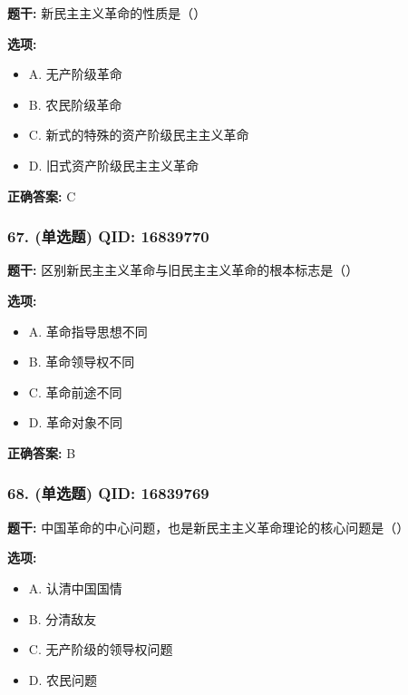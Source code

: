 \documentclass[12pt,UTF8]{ctexart}
\begin{document}
\textbf{题干:}
新民主主义革命的性质是（）

\textbf{选项:}
\begin{itemize}[leftmargin=*]

  \item A. 无产阶级革命

  \item B. 农民阶级革命

  \item C. 新式的特殊的资产阶级民主主义革命

  \item D. 旧式资产阶级民主主义革命

\end{itemize}

\textbf{正确答案:}
C

\vspace{0.3em}\hrulefill\vspace{0.7em}

\subsubsection*{67. (单选题) \small QID: 16839770}

\textbf{题干:}
区别新民主主义革命与旧民主主义革命的根本标志是（）

\textbf{选项:}
\begin{itemize}[leftmargin=*]

  \item A. 革命指导思想不同

  \item B. 革命领导权不同

  \item C. 革命前途不同

  \item D. 革命对象不同

\end{itemize}

\textbf{正确答案:}
B

\vspace{0.3em}\hrulefill\vspace{0.7em}

\subsubsection*{68. (单选题) \small QID: 16839769}

\textbf{题干:}
中国革命的中心问题，也是新民主主义革命理论的核心问题是（）

\textbf{选项:}
\begin{itemize}[leftmargin=*]

  \item A. 认清中国国情

  \item B. 分清敌友

  \item C. 无产阶级的领导权问题

  \item D. 农民问题

\end{itemize}
\end{document}
